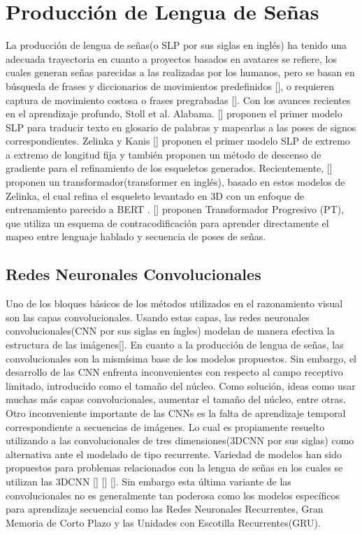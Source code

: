 \section{Producción de Lengua de Señas}\label{section:state-of-the-art:slp}
La producción de lengua de señas(o SLP por sus siglas en inglés) ha tenido una adecuada trayectoria en cuanto a proyectos basados en avatares se refiere, los cuales generan señas parecidas a las realizadas por los humanos, pero se basan en búsqueda de frases y diccionarios de movimientos predefinidos [\cite{McDonald2015AnAT}], o requieren captura de movimiento costosa o frases pregrabadas [\cite{Lu2011DataDrivenSO}]. Con los avances recientes en el aprendizaje profundo, Stoll et al. Alabama. [\cite{stoll2018sign}] proponen el primer modelo SLP para traducir texto en glosario de palabras y mapearlas a las poses de signos correspondientes. Zelinka y Kanis [\cite{Zelinka_2020_WACV}] proponen el primer modelo SLP de extremo a extremo de longitud fija y  también proponen un método de descenso de gradiente para el refinamiento de los esqueletos generados. Recientemente, [\cite{Jiang2021SkeletorST}] proponen un transformador(transformer en inglés), basado en estos modelos de Zelinka, el cual refina el esqueleto levantado en 3D con un enfoque de entrenamiento parecido a BERT . [\cite{saunders2020progressive}] proponen Transformador Progresivo (PT), que utiliza un esquema de contracodificación para aprender directamente el mapeo entre lenguaje hablado y secuencia de poses de señas.

\subsection{Redes Neuronales Convolucionales}\label{subsection:state-of-the-art:slp:CNN}
Uno de los bloques básicos de los métodos utilizados en el razonamiento visual son las capas convolucionales. Usando estas capas, las redes neuronales convolucionales(CNN por sus siglas en íngles) modelan de manera efectiva la estructura de las imágenes[\cite{LeCun1998GradientbasedLA}]. En cuanto a la producción de lengua de señas, las convolucionales son la mismísima base de los modelos propuestos. Sin embargo, el desarrollo de las CNN enfrenta inconvenientes con respecto al campo receptivo limitado, introducido como el tamaño del núcleo. Como solución, ideas como usar muchas más capas convolucionales, aumentar el tamaño del núcleo, entre otras. Otro inconveniente importante de las CNNs es la falta de aprendizaje temporal correspondiente a secuencias de imágenes. Lo cual es propiamente resuelto utilizando a las convolucionales de tres dimensiones(3DCNN por sus siglas) como alternativa ante el modelado de tipo recurrente. Variedad de modelos han sido propuestos para problemas relacionados con la lengua de señas en los cuales se utilizan las 3DCNN [\cite{Sharma2021ASL3DCNNAS}] [\cite{AlHammadi2020HandGR}] [\cite{2019ProceedingsOT}]. Sin embargo esta última variante de las convolucionales no es generalmente tan poderosa como los modelos específicos para aprendizaje secuencial como las Redes Neuronales Recurrentes, Gran Memoria de Corto Plazo y las Unidades con Escotilla Recurrentes(GRU).

